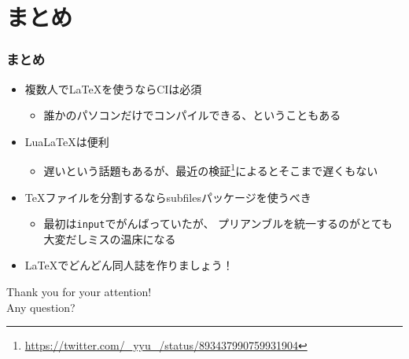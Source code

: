 \section{まとめ}

\begin{frame}
  \frametitle{まとめ}

  \begin{itemize}
    \item<2-> 複数人で\LaTeX を使うならCIは必須
    \begin{itemize}
      \item 誰かのパソコンだけでコンパイルできる、ということもある
    \end{itemize}

    \item<3-> Lua\LaTeX は便利
    \begin{itemize}
      \item 遅いという話題もあるが、最近の検証\footnote[frame]{\url{https://twitter.com/_yyu_/status/893437990759931904}}によるとそこまで遅くもない
    \end{itemize}

    \item<4-> \TeX ファイルを分割するならsubfilesパッケージを使うべき
    \begin{itemize}
      \item 最初は\texttt{input}でがんばっていたが、
      プリアンブルを統一するのがとても大変だしミスの温床になる
    \end{itemize}
    
    \item<5-> \LaTeX でどんどん同人誌を作りましょう！
  \end{itemize}
\end{frame}

\begin{frame}
  \centering
  {\Huge Thank you for your attention!\\
    \vspace{1em}
    Any question?
  }
\end{frame}


